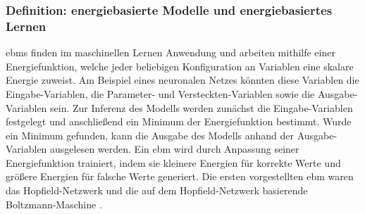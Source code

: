 \subsubsection{Definition: energiebasierte Modelle und energiebasiertes Lernen}

\glspl{ebm} finden im maschinellen Lernen Anwendung und arbeiten mithilfe einer Energiefunktion, welche jeder beliebigen Konfiguration an Variablen eine skalare Energie zuweist. Am Beispiel eines neuronalen Netzes könnten diese Variablen die Eingabe-Variablen, die Parameter- und Versteckten-Variablen sowie die Ausgabe-Variablen sein. Zur Inferenz des Modells werden zunächst die Eingabe-Variablen festgelegt und anschließend ein Minimum der Energiefunktion bestimmt. Wurde ein Minimum gefunden, kann die Ausgabe des Modells anhand der Ausgabe-Variablen ausgelesen werden. Ein \ac{ebm} wird durch Anpassung seiner Energiefunktion trainiert, indem sie kleinere Energien für korrekte Werte und größere Energien für falsche Werte generiert. \cite{Lecun2006} Die ersten vorgestellten \ac{ebm} waren das Hopfield-Netzwerk \cite{Hopfield1984} und die auf dem Hopfield-Netzwerk basierende Boltzmann-Maschine \cite{Ackley1985}.

